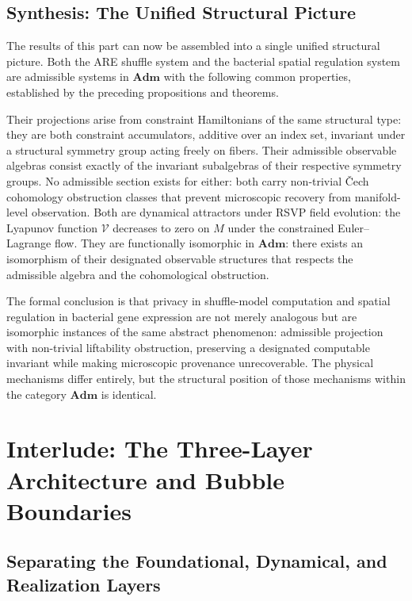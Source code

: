 \documentclass[12pt, a4paper]{article}
\theoremstyle{essaystyle}
\begin{document}
\subsection{Synthesis: The Unified Structural Picture}

The results of this part can now be assembled into a single unified structural picture.
Both the ARE shuffle system and the bacterial spatial regulation system are admissible
systems in $\mathbf{Adm}$ with the following common properties, established by the
preceding propositions and theorems.

Their projections arise from constraint Hamiltonians of the same structural type: they
are both constraint accumulators, additive over an index set, invariant under a
structural symmetry group acting freely on fibers. Their admissible observable algebras
consist exactly of the invariant subalgebras of their respective symmetry groups.
No admissible section exists for either: both carry non-trivial Čech cohomology
obstruction classes that prevent microscopic recovery from manifold-level observation.
Both are dynamical attractors under RSVP field evolution: the Lyapunov function
$\mathcal{V}$ decreases to zero on $M$ under the constrained Euler--Lagrange flow.
They are functionally isomorphic in $\mathbf{Adm}$: there exists an isomorphism of
their designated observable structures that respects the admissible algebra and the
cohomological obstruction.

The formal conclusion is that privacy in shuffle-model computation and spatial
regulation in bacterial gene expression are not merely analogous but are isomorphic
instances of the same abstract phenomenon: admissible projection with non-trivial
liftability obstruction, preserving a designated computable invariant while making
microscopic provenance unrecoverable. The physical mechanisms differ entirely, but the
structural position of those mechanisms within the category $\mathbf{Adm}$ is identical.

\section{Interlude: The Three-Layer Architecture and Bubble Boundaries}

\subsection{Separating the Foundational, Dynamical, and Realization Layers}
\end{document}
